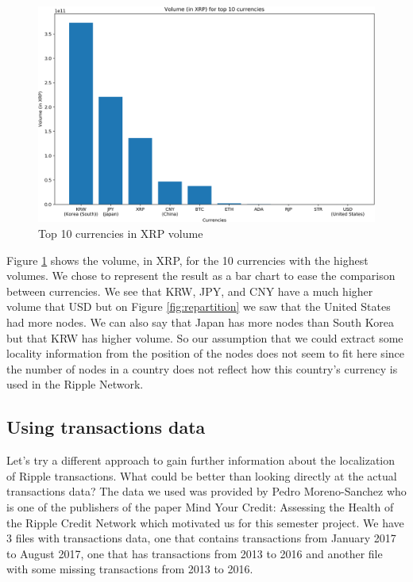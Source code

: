 \begin{figure}[h!]
    \centering
    \includegraphics[width = 0.95\linewidth]{top_10_currencies_in_volume_in_XRP.png}
    \caption{Top 10 currencies in XRP volume}
    \label{fig:volume}
\end{figure}

Figure \ref{fig:volume} shows the volume, in XRP, for the 10 currencies with the highest volumes. We chose to represent the result as a bar chart to ease the comparison between currencies. We see that KRW, JPY, and CNY have a much higher volume that USD but on Figure \ref{fig:repartition} we saw that the United States had more nodes. We can also say that Japan has more nodes than South Korea but that KRW has higher volume. So our assumption that we could extract some locality information from the position of the nodes does not seem to fit here since the number of nodes in a country does not reflect how this country's currency is used in the Ripple Network.

\subsection{Using transactions data}
Let's try a different approach to gain further information about the localization of Ripple transactions. What could be better than looking directly at the actual transactions data? The data we used was provided by Pedro Moreno-Sanchez who is one of the publishers of the paper Mind Your Credit: Assessing the Health of the Ripple Credit Network\cite{MindYourCredit} which motivated us for this semester project. We have 3 files with transactions data, one that contains transactions from January 2017 to August 2017, one that has transactions from 2013 to 2016 and another file with some missing transactions from 2013 to 2016.

